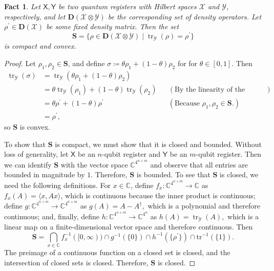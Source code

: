 \documentclass[11pt]{article}
\newtheorem{fact}[theorem]{Fact}
\theoremstyle{definition}
\DeclareMathOperator{\tr}{tr}
\newcommand{\complex}{\mathbb C}
\newcommand{\C}{\complex}
\newcommand{\calX}{\mathcal{X}}
\newcommand{\calY}{\mathcal{Y}}
\newcommand{\qreg}[1]{\mathsf{#1}}
\begin{document}
\begin{fact}\label{fact:partial-trace-compact-convex}
Let $\qreg{X}, \qreg{Y}$ be two quantum registers with Hilbert spaces $\calX$ and $\calY$, respectively, and let $\mathbf{D}(\calX \otimes \calY)$ be the corresponding set of density operators. Let $\rho^\prime \in \mathbf{D}(\calX)$ be some fixed density matrix.
Then the set 
\[
\mathbf{S} = \{ \rho \in \mathbf{D}(\calX \otimes \calY) \mid \tr_\calY(\rho) = \rho^\prime \}
\]
is compact and convex.
\end{fact}
\begin{proof}
   Let $\rho_1, \rho_2 \in \mathbf{S}$, and define $\sigma \coloneqq \theta \rho_1 + (1-\theta) \rho_2$ for for $\theta \in [0,1]$. Then  
   \begin{align*}
       \tr_\calY(\sigma) 
       &= \tr_\calY(\theta \rho_1 + (1-\theta) \rho_2) \\
       &= \theta \tr_\calY(\rho_1) + (1-\theta) \tr_\calY(\rho_2) && (\text{By the linearity of the partial trace.}) \\
       &= \theta \rho^\prime + (1-\theta) \rho^\prime && (\text{Because $\rho_1, \rho_2 \in \mathbf{S}$.}) \\
       &=  \rho^\prime,  
   \end{align*}
   so $\mathbf{S}$ is convex. 
   
To show that $\mathbf{S}$ is compact, we must show that it is closed and bounded.
Without loss of generality, let $\qreg{X}$ be an $n$-qubit register and $\qreg{Y}$ be an $m$-qubit register.
Then we can identify $\mathbf{S}$ with the vector space $\complex^{4^{n + m}}$ and observe that all entries are bounded in magnitude by $1$. Therefore, $\mathbf{S}$ is bounded.
To see that $\mathbf{S}$ is closed, we need the following definitions.
For $x \in \complex$, define $f_x: \complex^{4^{n+m}} \to \complex$ as 
$f_x(A) = \langle x, Ax \rangle$,
which is continuous because the inner product is continuous; 
define 
$g:\C^{4^{n + m}}\to\mathbb{C}^{4^{n +m}}$ as 
$g(A) = A - A^\dagger,$
which is a polynomial and therefore continuous;
and, finally, define $h:\C^{4^{n+m}}\to\mathbb{C}^{4^n}$ as 
$h(A) = \tr_\calY(A),$ which is a linear map on a finite-dimensional vector space and therefore continuous.
Then 
\[
\mathbf{S} = \bigcap_{x\in \mathbb{C}}f_x^{-1}([0,\infty))\cap g^{-1}(\{0\})\cap h^{-1}(\{\rho^\prime\})\cap\text{tr}^{-1}(\{1\}).
\]
The preimage of a continuous function on a closed set is closed, and the intersection of closed sets is closed. Therefore, $\mathbf{S}$ is closed. 
\end{proof}
\end{document}
